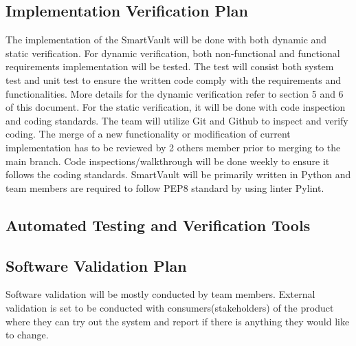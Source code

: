 \documentclass[12pt, titlepage]{article}
\begin{document}
\subsection{Implementation Verification Plan}

The implementation of the SmartVault will be done with both dynamic and static verification. For dynamic verification, both non-functional and functional requirements implementation will be tested. The test will consist both system test and unit test to ensure the written code comply with the requirements and functionalities. More details for the dynamic verification refer to section 5 and 6 of this document. For the static verification, it will be done with code inspection and coding standards. The team will utilize  Git and Github to inspect and verify coding. The merge of a new functionality or modification of current implementation has to be reviewed by 2 others member prior to merging to the main branch. Code inspections/walkthrough will be done weekly to ensure it follows the coding standards. SmartVault will be primarily written in Python and team members are required to follow PEP8 standard by using linter Pylint.
\subsection{Automated Testing and Verification Tools}



\subsection{Software Validation Plan}

Software validation will be mostly conducted by team members. External validation is set to be conducted with consumers(stakeholders) of the product where they can try out the system and report if there is anything they would like to change.
\end{document}
